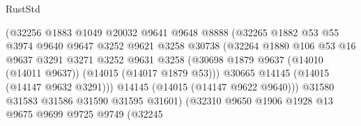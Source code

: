 \begin{lexlean}{RustStd}
\begin{coremodule}
                                    (@32256
                                      @1883
                                      @1049
                                      @20032
                                      @9641
                                      @9648
                                      @8888
                                      (@32265
                                        @1882
                                        @53
                                        @55
                                        @3974
                                        @9640
                                        @9647
                                        @3252
                                        @9621
                                        @3258
                                        @30738
                                        (@32264
                                          @1880
                                          @106
                                          @53
                                          @16
                                          @9637
                                          @3291
                                          @3271
                                          @3252
                                          @9631
                                          @3258
                                          (@30698
                                            @1879
                                            @9637
                                            (@14010 (@14011 @9637))
                                            (@14015 (@14017 @1879 @53)))
                                          @30665
                                          @14145
                                          (@14015 (@14147 @9632 @3291)))
                                        @14145
                                        (@14015 (@14147 @9622 @9640)))
                                      @31580
                                      @31583
                                      @31586
                                      @31590
                                      @31595
                                      @31601)
                                    (@32310
                                      @9650
                                      @1906
                                      @1928
                                      @13
                                      @9675
                                      @9699
                                      @9725
                                      @9749
                                      (@32245

\end{coremodule}
\end{lexlean}
